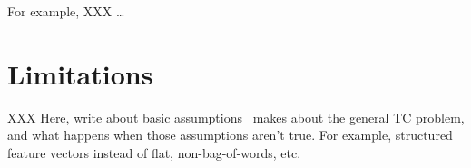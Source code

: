 For example, XXX \ldots

\section{Limitations}

XXX Here, write about basic assumptions \aicat\ makes about the
general TC problem, and what happens when those assumptions aren't
true.  For example, structured feature vectors instead of flat,
non-bag-of-words, etc.

